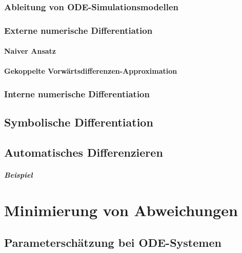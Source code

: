 		\subsection{Ableitung von ODE-Simulationsmodellen} %

		\subsection{Externe numerische Differentiation} %

			\subsubsection{Naiver Ansatz} %

			\subsubsection{Gekoppelte Vorwärtsdifferenzen-Approximation} %

		\subsection{Interne numerische Differentiation} %

	\section{Symbolische Differentiation} %

	\section{Automatisches Differenzieren} %

		\paragraph{Beispiel} %

\chapter{Minimierung von Abweichungen} %

	\section{Parameterschätzung bei ODE-Systemen} %

